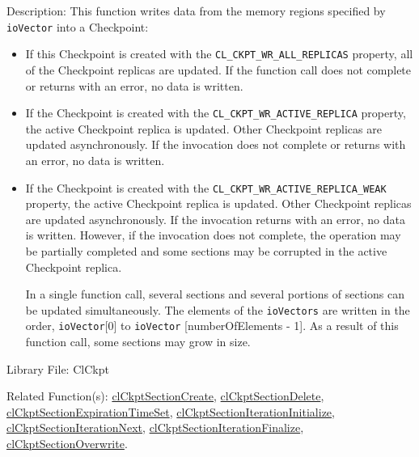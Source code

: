 \begin{flushleft}
\begin{Desc}
\begin{description}
\end{description}
\end{Desc}
\begin{Desc}
\item[Description:]This function writes data from the memory regions specified by {\tt{io\-Vector}} into a Checkpoint: 
\begin{itemize}
\item 
If this Checkpoint is created with the {\tt{CL\_\-CKPT\_\-WR\_\-ALL\_\-REPLICAS}} property, all of the Checkpoint replicas are updated. If the 
function call does not complete or returns with an error, no data is written.
\item 
If the Checkpoint is created with the
{\tt{CL\_\-CKPT\_\-WR\_\-ACTIVE\_\-REPLICA}} property, the active Checkpoint replica is updated. Other Checkpoint replicas
are updated asynchronously. If the invocation does not complete or returns with an error, no data is written.
\item 
If the Checkpoint is created with the
{\tt{CL\_\-CKPT\_\-WR\_\-ACTIVE\_\-REPLICA\_\-WEAK}} property, the active Checkpoint replica is updated. Other Checkpoint 
replicas are updated asynchronously. If the invocation returns with an error, no data is written. However, if the invocation does not complete, 
the operation may be partially completed and some sections may be corrupted in the active Checkpoint replica.\par
 \par
 In a single function call, several sections and several portions of sections can be updated simultaneously. The elements of the {\tt{io\-Vectors}} are 
 written in the order, {\tt{io\-Vector}}\mbox{[}0\mbox{]} to {\tt{io\-Vector}} \mbox{[}number\-Of\-Elements - 1\mbox{]}. As a result of this function call,
 some sections may grow in size.
 \end{itemize}
\end{Desc}
\begin{Desc}
\item[Library File:]Cl\-Ckpt\end{Desc}
\begin{Desc}
\item[Related Function(s):]\hyperlink{pageckpt110}{cl\-Ckpt\-Section\-Create}, \hyperlink{pageckpt111}{cl\-Ckpt\-Section\-Delete}, 
\hyperlink{pageckpt112}{cl\-Ckpt\-Section\-Expiration\-Time\-Set}, \hyperlink{pageckpt113}{cl\-Ckpt\-Section\-Iteration\-Initialize}, 
\hyperlink{pageckpt114}{cl\-Ckpt\-Section\-Iteration\-Next}, \hyperlink{pageckpt115}{cl\-Ckpt\-Section\-Iteration\-Finalize}, 
\hyperlink{pageckpt117}{cl\-Ckpt\-Section\-Overwrite}. \end{Desc}
\newpage



\end{flushleft}
